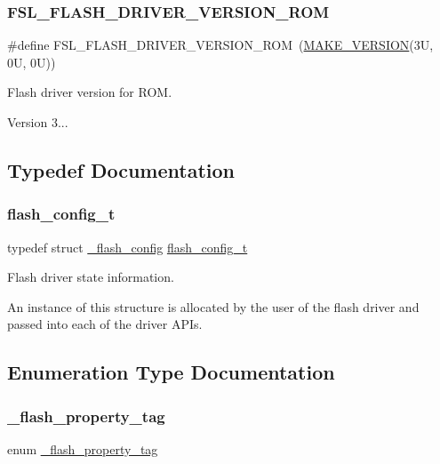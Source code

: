 \subsubsection{\texorpdfstring{FSL\_FLASH\_DRIVER\_VERSION\_ROM}{FSL\_FLASH\_DRIVER\_VERSION\_ROM}}
{\footnotesize\ttfamily \#define F\+S\+L\+\_\+\+F\+L\+A\+S\+H\+\_\+\+D\+R\+I\+V\+E\+R\+\_\+\+V\+E\+R\+S\+I\+O\+N\+\_\+\+R\+OM~(\mbox{\hyperlink{group__ftfx__utilities_ga812138aa3315b0c6953c1a26130bcc37}{M\+A\+K\+E\+\_\+\+V\+E\+R\+S\+I\+ON}}(3\+U, 0\+U, 0\+U))}



Flash driver version for R\+OM. 

Version 3... 

\subsection{Typedef Documentation}
\mbox{\label{group__ftfx__flash__driver_ga0dfc969e6f9e17c17e60d823565141a5}} 
\subsubsection{\texorpdfstring{flash\_config\_t}{flash\_config\_t}}
{\footnotesize\ttfamily typedef struct \mbox{\hyperlink{struct__flash__config}{\+\_\+flash\+\_\+config}}  \mbox{\hyperlink{group__ftfx__flash__driver_ga0dfc969e6f9e17c17e60d823565141a5}{flash\+\_\+config\+\_\+t}}}



Flash driver state information. 

An instance of this structure is allocated by the user of the flash driver and passed into each of the driver A\+P\+Is. 

\subsection{Enumeration Type Documentation}
\mbox{\label{group__ftfx__flash__driver_gab58c8e11c7236162806360885b462391}} 
\subsubsection{\texorpdfstring{\_flash\_property\_tag}{\_flash\_property\_tag}}
{\footnotesize\ttfamily enum \mbox{\hyperlink{group__ftfx__flash__driver_gab58c8e11c7236162806360885b462391}{\+\_\+flash\+\_\+property\+\_\+tag}}}



